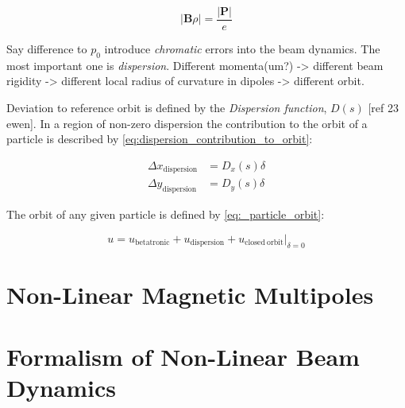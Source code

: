 \begin{equation}
    \lvert \mathbf{B} \rho \rvert = \frac{\lvert \mathbf{P} \lvert}{e}
    \label{eq:beam_rigidity}
\end{equation}
\bigbreak

Say difference to $p_0$ introduce \emph{chromatic} errors into the beam dynamics.
The most important one is \emph{dispersion}.
Different momenta(um?) -> different beam rigidity -> different local radius of curvature in dipoles -> different orbit.

Deviation to reference orbit is defined by the \emph{Dispersion function}, $D(s)$ [ref 23 ewen].
In a region of non-zero dispersion the contribution to the orbit of a particle is described by \cref{eq:dispersion_contribution_to_orbit}:
\bigbreak

\begin{equation}
    \begin{aligned}
    \Delta x_{\mathrm{dispersion}} &= D_{x}(s) \delta \\
    \Delta y_{\mathrm{dispersion}} &= D_{y}(s) \delta
    \end{aligned}
    \label{eq:dispersion_contribution_to_orbit}
\end{equation}
\bigbreak

The orbit of any given particle is defined by \cref{eq:_particle_orbit}:
\bigbreak

\begin{equation}
    u = u_{\mathrm{betatronic}} + u_{\mathrm{dispersion}} + \left.u_{\mathrm{closed \ orbit}} \right|_{\delta = 0}
    \label{eq:_particle_orbit}
\end{equation}


\section{Non-Linear Magnetic Multipoles}


\section{Formalism of Non-Linear Beam Dynamics}


